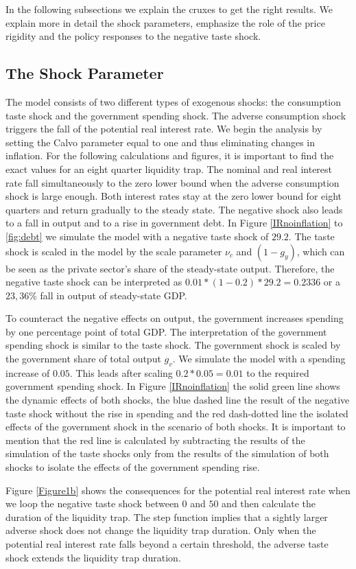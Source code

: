 \documentclass[12pt,a4paper,oneside,titlepage]{article}
\begin{document}
In the following subsections we explain the cruxes to get the right results. We explain more in detail the shock parameters, emphasize the role of the price rigidity and the policy responses to the negative taste shock.


\subsection*{The Shock Parameter}
The model consists of two different types of exogenous shocks: the consumption taste shock and the government spending shock. The adverse consumption shock triggers the fall of the potential real interest rate. We begin the analysis by setting the Calvo parameter equal to one and thus eliminating changes in inflation. For the following calculations and figures, it is important to find the exact values for an eight quarter liquidity trap. The nominal and real interest rate fall simultaneously to the zero lower bound when the adverse consumption shock is large enough. Both interest rates stay at the zero lower bound for eight quarters and return  gradually to the steady state. The negative shock also leads to a fall in output and to a rise in government debt. In Figure \ref{IRnoinflation} to \ref{fig:debt} we simulate the model with a negative taste shock of $29.2$. The taste shock is scaled in the model by the scale parameter $\nu_c$ and $\left(1- g_y\right)$, which can be seen as the private sector’s share of the steady-state output. Therefore, the negative taste shock can be interpreted as $0.01 * \left(1-0.2\right) * 29.2 = 0.2336$ or a $23,36\%$ fall in output of steady-state GDP.
\par
\bigskip
To counteract the negative effects on output, the government increases spending by one percentage point of total GDP. The interpretation of the government spending shock is similar to the taste shock.  The government shock is scaled by the government share of total output $g_v$. We simulate the model with a spending increase of $0.05$. This leads after scaling $0.2 * 0.05 = 0.01$ to the required government spending shock.
In Figure \ref{IRnoinflation} the solid green line shows the dynamic effects of both shocks, the blue dashed line the result of the negative taste shock without the rise in spending and the red dash-dotted line the isolated effects of the government shock in the scenario of both shocks. It is important to mention that the red line is calculated by subtracting the results of the simulation of the taste shocks only from the results of the simulation of both shocks to isolate the effects of the government spending rise.
\par
\bigskip
Figure \ref{Figure1b} shows the consequences for the potential real interest rate when we loop the negative taste shock between $0$ and $50$ and then calculate the duration of the liquidity trap.
The step function implies that a sightly larger adverse shock does not change the liquidity trap duration. Only when the potential real interest rate falls beyond a certain threshold, the adverse taste shock extends the liquidity trap duration.
\end{document}
